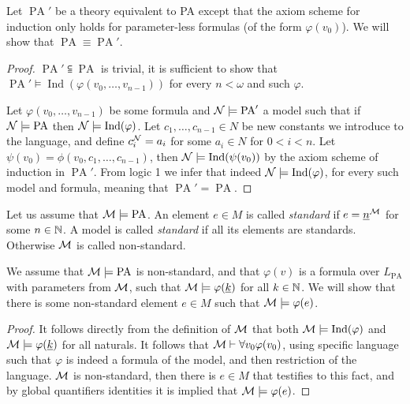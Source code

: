 \question{}
Let $\operatorname{PA}'$ be a theory equivalent to PA except that the axiom scheme for induction only holds for parameter-less formulas (of the form $\varphi(v_0)$).
We will show that $\operatorname{PA} \equiv \operatorname{PA}'$.
\begin{proof}
	$\operatorname{PA}' \subseteqq \operatorname{PA}$ is trivial, it is sufficient to show that $\operatorname{PA}' \models \operatorname{Ind}(\varphi(v_0, \ldots, v_{n - 1}))$ for every $n < \omega$ and such $\varphi$.

	Let $\varphi(v_0, \ldots, v_{n - 1})$ be some formula and $\mathcal{N} \models \operatorname{PA}'$ a model such that if $\mathcal{N} \models \operatorname{PA}$ then $\mathcal{N} \models \operatorname{Ind}(\varphi)$.
	Let $c_1, \ldots, c_{n - 1} \in N$ be new constants we introduce to the language, and define $c_i^{\mathcal{N}} = a_i$ for some $a_i \in N$ for $0 < i < n$.
	Let $\psi(v_0) = \phi(v_0, c_1, \ldots, c_{n - 1})$, then $\mathcal{N} \models \operatorname{Ind}(\psi(v_0))$ by the axiom scheme of induction in $\operatorname{PA}'$.
	From logic 1 we infer that indeed $\mathcal{N} \models \operatorname{Ind}(\varphi)$, for every such model and formula, meaning that $\operatorname{PA}' = \operatorname{PA}$.
\end{proof}

\question{}
Let us assume that $\mathcal{M} \models \operatorname{PA}$.
An element $e \in M$ is called \textit{standard} if $e = \underline{n}^{\mathcal{M}}$ for some $n \in \mathbb{N}$.
A model is called \textit{standard} if all its elements are standards.
Otherwise $\mathcal{M}$ is called non-standard.

\subquestion{}
We assume that $\mathcal{M} \models \operatorname{PA}$ is non-standard, and that $\varphi(v)$ is a formula over $L_{\operatorname{PA}}$ with parameters from $\mathcal{M}$,
such that $\mathcal{M} \models \varphi(\underline{k})$ for all $k \in \mathbb{N}$.
We will show that there is some non-standard element $e \in M$ such that $\mathcal{M} \models \varphi(e)$.
\begin{proof}
	It follows directly from the definition of $\mathcal{M}$ that both $\mathcal{M} \models \operatorname{Ind}(\varphi)$ and $\mathcal{M} \models \varphi(\underline{k})$ for all naturals.
	It follows that $\mathcal{M} \vdash \forall v_0 \varphi(v_0)$, using specific language such that $\varphi$ is indeed a formula of the model, and then restriction of the language.
	$\mathcal{M}$ is non-standard, then there is $e \in M$ that testifies to this fact, and by global quantifiers identities it is implied that $\mathcal{M} \models \varphi(e)$.
\end{proof}

